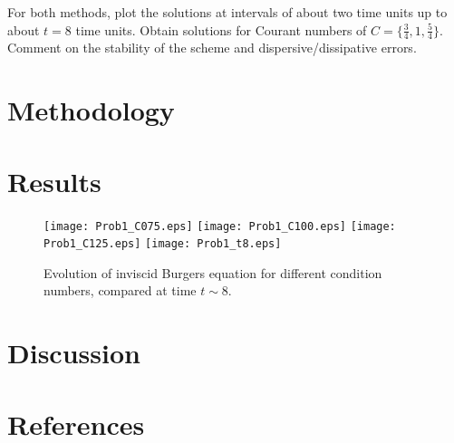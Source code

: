 \documentclass[11pt]{article}
\begin{document}
For both methods, plot the solutions at intervals of about two time units up to about $t=8$ time units. Obtain solutions for Courant numbers of $C = \{\tfrac{3}{4}, 1, \tfrac{5}{4}\}$. Comment on the stability of the scheme and dispersive/dissipative errors.

\section{Methodology} %

\section{Results} %

\begin{figure}[h!]
\begin{center}
\texttt{[image: Prob1\_C075.eps]}
\texttt{[image: Prob1\_C100.eps]}
\texttt{[image: Prob1\_C125.eps]}
\texttt{[image: Prob1\_t8.eps]}
\\[0.5cm]
\caption{Evolution of inviscid Burgers equation for different condition numbers, compared at time $t \sim 8$.}
\label{fig:MacCormack}
\end{center}
\end{figure}

\section{Discussion} %

\section{References} %
\end{document}
